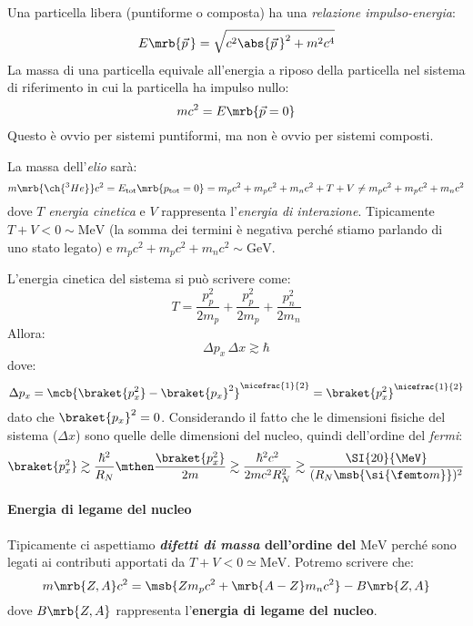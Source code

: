 Una particella libera (puntiforme o composta) ha una \textit{relazione
impulso-energia}:
\[
  E \mrb{\vec{p}\,} = \sqrt{c^2 \abs{\vec{p}\,}^{2} + m^2 c^4}
\]
La massa di una particella equivale all'energia a riposo della particella nel
sistema di riferimento in cui la particella ha impulso nullo:
\[
  mc^2 = E \mrb{\vec{p} = 0}
\]
Questo è ovvio per sistemi puntiformi, ma non è ovvio per sistemi composti.
\begin{example}[Nucleo di \ch{^{3}He}]
  La massa dell'\textit{elio}  sarà:
  \[
    m \mrb{\ch{^{3}He}} c^2 = E _\text{tot} \mrb{p _\text{tot} = 0}
    = m_p c^2 + m_p c^2 + m_n c^2 + T + V \neq m_p c^2 + m_p c^2 + m_n c^2
  \]
  dove $T$ \textit{energia cinetica} e $V$ rappresenta l'\textit{energia di
  interazione}.
  Tipicamente $T + V < 0 \sim \si{\MeV}$ (la somma dei termini è negativa
  perché stiamo parlando di uno stato legato) e $m_p c^2 + m_p c^2 + m_n c^2
  \sim \si{\GeV}$.

  L'energia cinetica del sistema si può scrivere come:
  \[
    T = \frac{p_p^2}{2 m_p} + \frac{p_p^2}{2 m_p} + \frac{p_n^2}{2 m_n}
  \]
  Allora:
  \[
    \Delta p_x\, \Delta x \gtrsim \hbar
  \]
  dove:
  \[
    \Delta p_x = \mcb{\braket{p_x^2} - \braket{p_x}^{2}}^{\nicefrac{1}{2}} =
    \braket{p_x^2}^{\nicefrac{1}{2}}
  \]
  dato che $\braket{p_x}^{2} = 0$.
  Considerando il fatto che le dimensioni fisiche del sistema ($\Delta x$) sono
  quelle delle dimensioni del nucleo, quindi dell'ordine del \textit{fermi}:
  \[
    \braket{p_x^2} \gtrsim \frac{\hbar^2}{R_N}
    \mthen
    \frac{\braket{p_x^2}}{2m} \gtrsim \frac{\hbar^2 c^2}{2m c^2 R_N^2} \gtrsim
    \frac{\SI{20}{\MeV}}{(R_N \msb{\si{\femto m}})^{2}}
  \]
\end{example}

\paragraph{Energia di legame del nucleo}
Tipicamente ci aspettiamo \textbf{\textit{difetti di massa} dell'ordine del}
$\si{\MeV}$ perché sono legati ai contributi apportati da $T + V < 0 \simeq
\si{\MeV}$. Potremo scrivere che:
\[
  m \mrb{Z, A} c^2 = \msb{Z m_p c^2 + \mrb{A - Z} m_n c^2} - B \mrb{Z, A}
\]
dove $B \mrb{Z, A}$ rappresenta l'\textbf{energia di legame del nucleo}.

